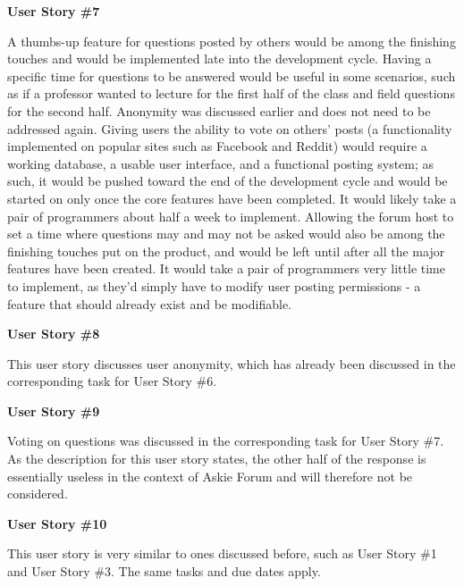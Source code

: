 \documentclass[12pt]{article}
\begin{document}
\textbf{User Story \#7}
\begin{flushleft}
A thumbs-up feature for questions posted by others would be among the finishing touches and would be implemented late into the development cycle. Having a specific time for questions to be answered would be useful in some scenarios, such as if a professor wanted to lecture for the first half of the class and field questions for the second half. Anonymity was discussed earlier and does not need to be addressed again. Giving users the ability to vote on others' posts (a functionality implemented on popular sites such as Facebook and Reddit) would require a working database, a usable user interface, and a functional posting system; as such, it would be pushed toward the end of the development cycle and would be started on only once the core features have been completed. It would likely take a pair of programmers about half a week to implement. Allowing the forum host to set a time where questions may and may not be asked would also be among the finishing touches put on the product, and would be left until after all the major features have been created. It would take a pair of programmers very little time to implement, as they'd simply have to modify user posting permissions - a feature that should already exist and be modifiable. 
\newline
\end{flushleft}

\textbf{User Story \#8}
\begin{flushleft}
This user story discusses user anonymity, which has already been discussed in the corresponding task for User Story \#6.
\newline
\end{flushleft}

\textbf{User Story \#9}
\begin{flushleft}
Voting on questions was discussed in the corresponding task for User Story \#7. As the description for this user story states, the other half of the response is essentially useless in the context of Askie Forum and will therefore not be considered.
\newline
\end{flushleft}

\textbf{User Story \#10}
\begin{flushleft}
This user story is very similar to ones discussed before, such as User Story \#1 and User Story \#3. The same tasks and due dates apply.
\newline
\end{flushleft}
\end{document}
